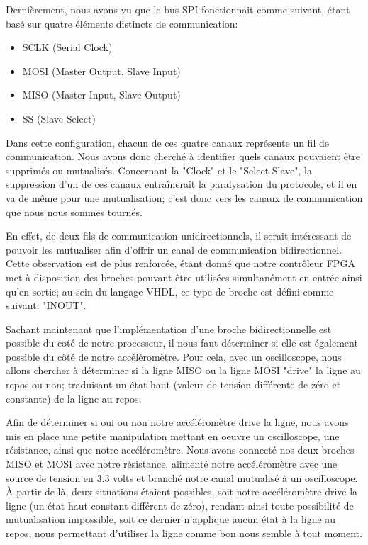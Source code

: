 \documentclass[french,a4paper,12pt]{report}
\begin{document}
	Dernièrement, nous avons vu que le bus SPI fonctionnait comme suivant, étant basé sur quatre éléments distincts de communication:
	
	\begin{itemize}
		\item SCLK (Serial Clock) 
		\item MOSI (Master Output, Slave Input) 
		\item MISO (Master Input, Slave Output) 
		\item SS (Slave Select)
	\end{itemize}
	
	Dans cette configuration, chacun de ces quatre canaux représente un fil de communication. Nous avons donc cherché à identifier quels canaux pouvaient être supprimés ou mutualisés. Concernant la "Clock" et le "Select Slave", la suppression d'un de ces canaux entraînerait la paralysation du protocole, et il en va de même pour une mutualisation; c'est donc vers les canaux de communication que nous nous sommes tournés.
	
	En effet, de deux fils de communication unidirectionnels, il serait intéressant de pouvoir les mutualiser afin d'offrir un canal de communication bidirectionnel. Cette observation est de plus renforcée, étant donné que notre contrôleur FPGA met à disposition des broches pouvant être utilisées simultanément en entrée ainsi qu'en sortie; au sein du langage VHDL, ce type de broche est défini comme suivant: "INOUT".
	
	Sachant maintenant que l'implémentation d'une broche bidirectionnelle est possible du coté de notre processeur, il nous faut déterminer si elle est également possible du côté de notre accéléromètre. Pour cela, avec un oscilloscope, nous allons chercher à déterminer si la ligne MISO ou la ligne MOSI "drive" la ligne au repos ou non; traduisant un état haut (valeur de tension différente de zéro et constante) de la ligne au repos.
	
	Afin de déterminer si oui ou non notre accéléromètre drive la ligne, nous avons mis en place une petite manipulation mettant en oeuvre un oscilloscope, une résistance, ainsi que notre accéléromètre. Nous avons connecté nos deux broches MISO et MOSI avec notre résistance, alimenté notre accéléromètre avec une source de tension en 3.3 volts et branché notre canal mutualisé à un oscilloscope. À partir de là, deux situations étaient possibles, soit notre accéléromètre drive la ligne (un état haut constant différent de zéro), rendant ainsi toute possibilité de mutualisation impossible, soit ce dernier n'applique aucun état à la ligne au repos, nous permettant d'utiliser la ligne comme bon nous semble à tout moment.
	
\end{document}
